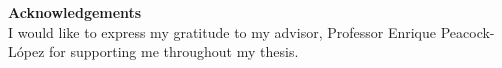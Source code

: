 \setcounter{page}{1}
\thispagestyle{plain}
\begin{center}
	\vspace*{\fill}
	\textbf{Acknowledgements}\\
	I would like to express my gratitude to my advisor, Professor Enrique Peacock-L\'opez for supporting me throughout my thesis.
	\vspace*{\fill}
\end{center}
\pagebreak